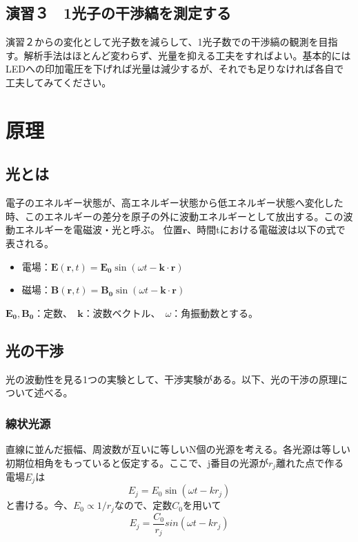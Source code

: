 \documentclass[10pt]{ujarticle}
\begin{document}
\subsection{演習３　1光子の干渉縞を測定する}
演習２からの変化として光子数を減らして、1光子数での干渉縞の観測を目指す。解析手法はほとんど変わらず、光量を抑える工夫をすればよい。基本的にはLEDへの印加電圧を下げれば光量は減少するが、それでも足りなければ各自で工夫してみてください。

\section{原理}

\subsection{光とは}
電子のエネルギー状態が、高エネルギー状態から低エネルギー状態へ変化した時、このエネルギーの差分を原子の外に波動エネルギーとして放出する。この波動エネルギーを電磁波・光と呼ぶ。
位置$\bm{r}$、時間tにおける電磁波は以下の式で表される。
\begin{itemize}
\item 電場：$\bm{E} (\bm{r}, t) = \bm{E_0} \sin (\omega t - \bm{k} \cdot \bm{r} ) $
\item 磁場：$\bm{B} (\bm{r}, t) = \bm{B_0} \sin (\omega t - \bm{k} \cdot \bm{r} ) $
\end{itemize}
$\bm{E_0}, \bm{B_0}$：定数、　$\bm{k}$：波数ベクトル、　$\omega$：角振動数とする。

\subsection{光の干渉}
光の波動性を見る1つの実験として、干渉実験がある。以下、光の干渉の原理について述べる。
\subsubsection{線状光源}
直線に並んだ振幅、周波数が互いに等しいN個の光源を考える。各光源は等しい初期位相角をもっていると仮定する。ここで、j番目の光源が$r_j$離れた点で作る電場$E_j$は
\[
E_j = E_0 \sin(\omega t - k r_j)
\]
と書ける。今、$E_0 \varpropto 1/{r_j}$なので、定数$C_0$を用いて
\[
E_j = \frac{C_0}{r_j} sin(\omega t - k r_j)
\]
\end{document}
